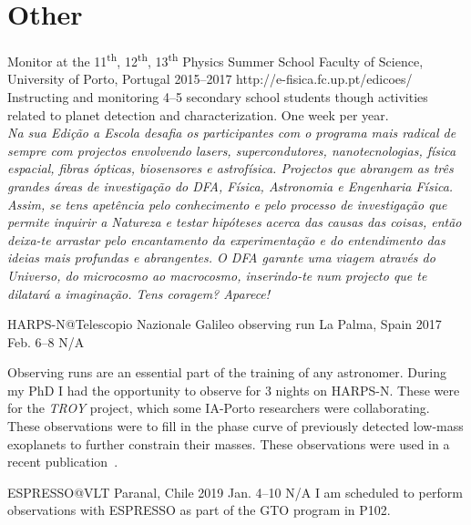\section{Other}\label{app_sec:other}

{Monitor at the 11\textsuperscript{th}, 12\textsuperscript{th}, 13\textsuperscript{th} Physics Summer School}
{Faculty of Science, University of Porto, Portugal}%
{2015--2017}%
{http://e-fisica.fc.up.pt/edicoes/}%
{}%
{Instructing and monitoring 4--5 secondary school students though activities related to planet detection and characterization. One week per year.\\
  \emph{Na sua Edição a Escola desafia os participantes com o programa mais radical de sempre com projectos envolvendo lasers, supercondutores, nanotecnologias, física espacial, fibras ópticas, biosensores e astrofísica. Projectos que abrangem as três grandes áreas de investigação do DFA, Física, Astronomia e Engenharia Física. Assim, se tens apetência pelo conhecimento e pelo processo de investigação que permite inquirir a Natureza e testar hipóteses acerca das causas das coisas, então deixa-te arrastar pelo encantamento da experimentação e do entendimento das ideias mais profundas e abrangentes. O DFA garante uma viagem através do Universo, do microcosmo ao macrocosmo, inserindo-te num projecto que te dilatará a imaginação. Tens coragem? Aparece!}}%

{HARPS-N@Telescopio Nazionale Galileo observing run}
{La Palma, Spain}%
{2017 Feb. 6--8}%
{N/A}%
{}%
{Observing runs are an essential part of the training of any astronomer.
    During my PhD I had the opportunity to observe for 3 nights on HARPS-N. These were for the \emph{TROY} project, which some IA-Porto researchers were collaborating.  These observations were to fill in the phase curve of previously detected low-mass exoplanets to further constrain their masses. These observations were used in a recent publication~\citet{lillo-box_troy_2018}.

}%


{ESPRESSO@VLT}
{Paranal, Chile} %
{2019 Jan. 4--10} %
{N/A}%
{}%
{I am scheduled to perform observations with ESPRESSO as part of the GTO program in P102.}
